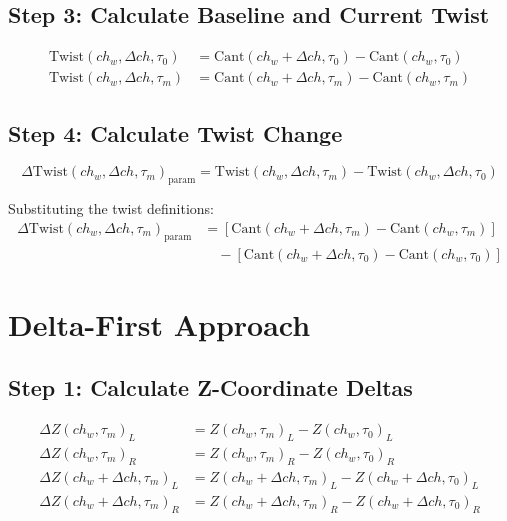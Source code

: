 \documentclass{article}
\begin{document}
\subsection{Step 3: Calculate Baseline and Current Twist}
\begin{align}
\text{Twist}(ch_w, \Delta ch, \tau_0) &= \text{Cant}(ch_w + \Delta ch, \tau_0) - \text{Cant}(ch_w, \tau_0) \\
\text{Twist}(ch_w, \Delta ch, \tau_m) &= \text{Cant}(ch_w + \Delta ch, \tau_m) - \text{Cant}(ch_w, \tau_m)
\end{align}

\subsection{Step 4: Calculate Twist Change}
\begin{equation}
\Delta\text{Twist}(ch_w, \Delta ch, \tau_m)_{\text{param}} = \text{Twist}(ch_w, \Delta ch, \tau_m) - \text{Twist}(ch_w, \Delta ch, \tau_0)
\end{equation}

Substituting the twist definitions:
\begin{align}
\Delta\text{Twist}(ch_w, \Delta ch, \tau_m)_{\text{param}} &= [\text{Cant}(ch_w + \Delta ch, \tau_m) - \text{Cant}(ch_w, \tau_m)] \nonumber \\
&\quad - [\text{Cant}(ch_w + \Delta ch, \tau_0) - \text{Cant}(ch_w, \tau_0)]
\end{align}

\section{Delta-First Approach}

\subsection{Step 1: Calculate Z-Coordinate Deltas}
\begin{align}
\Delta Z(ch_w, \tau_m)_L &= Z(ch_w, \tau_m)_L - Z(ch_w, \tau_0)_L \\
\Delta Z(ch_w, \tau_m)_R &= Z(ch_w, \tau_m)_R - Z(ch_w, \tau_0)_R \\
\Delta Z(ch_w + \Delta ch, \tau_m)_L &= Z(ch_w + \Delta ch, \tau_m)_L - Z(ch_w + \Delta ch, \tau_0)_L \\
\Delta Z(ch_w + \Delta ch, \tau_m)_R &= Z(ch_w + \Delta ch, \tau_m)_R - Z(ch_w + \Delta ch, \tau_0)_R
\end{align}
\end{document}
